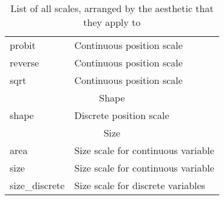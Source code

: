 \begin{table}
\begin{center}
\begin{tabular}{ll}
    probit     & Continuous position scale          \\
    reverse    & Continuous position scale          \\
    sqrt       & Continuous position scale          \\
     \midrule
    \multicolumn{2}{c}{Shape} \\
    \midrule
    shape                  &   Discrete position scale\\
     \midrule
    \multicolumn{2}{c}{Size} \\
    \midrule
    area          & Size scale for continuous variable\\
    size          & Size scale for continuous variable\\
    size\_discrete & Size scale for discrete variables \\
    \bottomrule
    \end{tabular}
  \end{center}
  \caption{List of all scales, arranged by the aesthetic that they apply to}
  \label{tbl:scale_list}
\end{table}